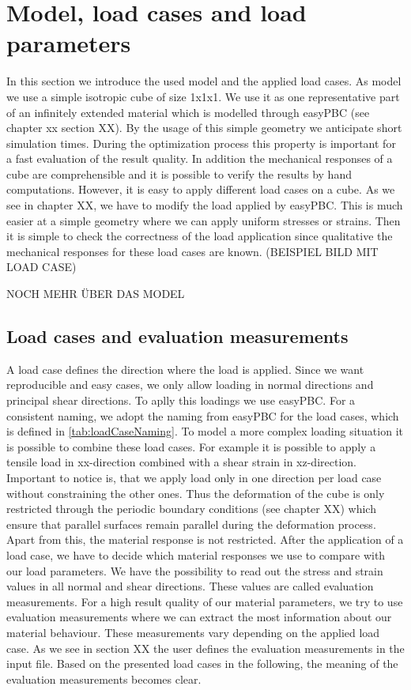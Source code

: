     \section{Model, load cases and load parameters}
    In this section we introduce the used model and the applied load cases. 
    As model we use a simple isotropic cube of size 1x1x1. We use it as one representative part of an infinitely extended material which is modelled through easyPBC (see chapter xx section XX). By the usage of this simple geometry we anticipate short simulation times. During the optimization process this property is important for a fast evaluation of the result quality. In addition the mechanical responses of a cube are comprehensible and it is possible to verify the results by hand computations. However, it is easy to apply different load cases on a cube. As we see in chapter XX, we have to modify the load applied by easyPBC. This is much easier at a simple geometry where we can apply uniform stresses or strains. Then it is simple to check the correctness of the load application since qualitative the mechanical responses for these load cases are known. (BEISPIEL BILD MIT LOAD CASE)
    
    NOCH MEHR ÜBER DAS MODEL
    
    \subsection{Load cases and evaluation measurements}\label{subsec: loadCases}
    
    A load case defines the direction where the load is applied. Since we want reproducible and easy cases, we only allow loading in normal directions and principal shear directions. To aplly this loadings we use easyPBC. For a consistent naming, we adopt the naming from easyPBC for the load cases, which is defined in \autoref{tab:loadCaseNaming}.
     To model a more complex loading situation it is possible to combine these load cases. For example it is possible to apply a tensile load in xx-direction combined with a shear strain in xz-direction. Important to notice is, that we apply load only in one direction per load case without constraining the other ones. Thus the deformation of the cube is only restricted through the periodic boundary conditions (see chapter XX) which ensure that parallel surfaces remain parallel during the deformation process. Apart from this, the material response is not restricted. After the application of a load case, we have to decide which material responses we use to compare with our load parameters. We have the possibility to read out the stress and strain values in all normal and shear directions. These values are called evaluation measurements. For a high result quality of our material parameters, we try to use evaluation measurements where we can extract the most information about our material behaviour. These measurements vary depending on the applied load case. As we see in section XX the user defines the evaluation measurements in the input file. Based on the presented load cases in the following, the meaning of the evaluation measurements becomes clear. 

